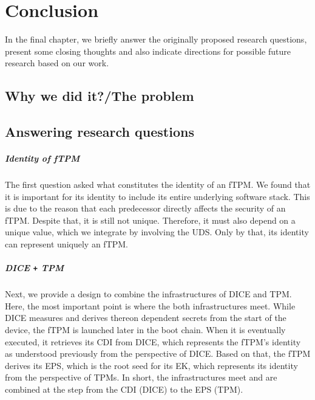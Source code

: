 
\chapter{Conclusion}\label{chapter:future_work_and_conclusion}

In the final chapter, we briefly answer the originally proposed research questions, present some closing thoughts and also indicate directions for possible future research based on our work.

\section{Why we did it?/The problem}

\section{Answering research questions}


\paragraph{Identity of \ac{fTPM}}
The first question asked what constitutes the identity of an fTPM\@.
We found that it is important for its identity to include its entire underlying software stack.
This is due to the reason that each predecessor directly affects the security of an \ac{fTPM}.
Despite that, it is still not unique.
Therefore, it must also depend on a unique value, which we integrate by involving the \ac{UDS}.
Only by that, its identity can represent uniquely an \ac{fTPM}.

\paragraph{\acs{DICE} \texttt{+} \acs{TPM}}
Next, we provide a design to combine the infrastructures of \ac{DICE} and \ac{TPM}.
Here, the most important point is where the both infrastructures meet.
While \ac{DICE} measures and derives thereon dependent secrets from the start of the device, the \ac{fTPM} is launched later in the boot chain.
When it is eventually executed, it retrieves its \ac{CDI} from \ac{DICE}, which represents the fTPM's identity as understood previously from the perspective of \ac{DICE}.
Based on that, the \ac{fTPM} derives its \ac{EPS}, which is the root seed for its \ac{EK}, which represents its identity from the perspective of \acp{TPM}.
In short, the infrastructures meet and are combined at the step from the \ac{CDI} (DICE) to the \ac{EPS} (TPM).

